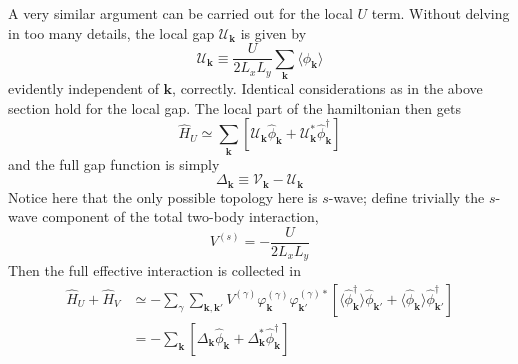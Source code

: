 A very similar argument can be carried out for the local $U$ term. Without delving in too many details, the local gap $\mathcal{U}_\mathbf{k}$ is given by
\begin{equation}\label{eq:sgap-function-definition}
	\mathcal{U}_\mathbf{k} \equiv \frac{U}{2 L_x L_y} \sum_{\mathbf{k}} \langle 
	\hat \phi_\mathbf{k}
	\rangle
\end{equation}
evidently independent of $\mathbf{k}$, correctly. Identical considerations as in the above section hold for the local gap. The local part of the hamiltonian then gets
\begin{equation}\label{eq:extended-hubbard-local-interaction-mean-field-reciprocal}
	\hat H_U \simeq \sum_\mathbf{k} \left[
	\mathcal{U}_\mathbf{k} \hat \phi_\mathbf{k} + \mathcal{U}_\mathbf{k}^* \hat \phi_\mathbf{k}^\dagger
	\right]	
\end{equation}
and the full gap function is simply
\begin{equation}\label{eq:gap-function-definition}
	\Delta_\mathbf{k} \equiv \mathcal{V}_\mathbf{k} - \mathcal{U}_\mathbf{k}
\end{equation}
Notice here that the only possible topology here is $s$-wave; define trivially the $s$-wave component of the total two-body interaction,
\[
V^{(s)} = - \frac{U}{2L_xL_y}
\]
Then the full effective interaction is collected in
\[
\begin{aligned}
	\hat H_U +\hat H_V &\simeq - \sum_\gamma \sum_{\mathbf{k}, \mathbf{k}'}
	V^{(\gamma)} \varphi_\mathbf{k}^{(\gamma)} \varphi_{\mathbf{k}'}^{(\gamma)*} \left[
		\langle 
			\hat \phi_\mathbf{k}^\dagger
		\rangle \hat \phi_{\mathbf{k}'} + 	\langle 
			\hat \phi_\mathbf{k}
		\rangle \hat \phi_{\mathbf{k}'}^\dagger
	\right]	\\
	&= - \sum_\mathbf{k} \left[
	\Delta_\mathbf{k} \hat \phi_\mathbf{k} + \Delta_\mathbf{k}^* \hat \phi_\mathbf{k}^\dagger
	\right]	
\end{aligned}
\]


